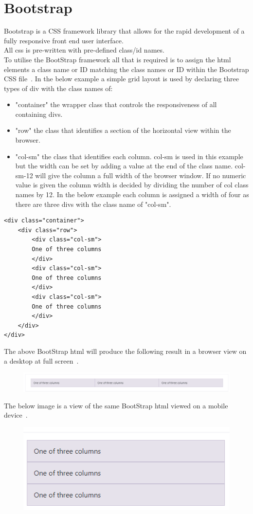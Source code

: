 \section{Bootstrap} 
Bootstrap is a CSS framework library that allows for the rapid development of a fully responsive front end user interface.\\
All css is pre-written with pre-defined class/id names.\\
To utilise the BootStrap framework all that is required is to assign the html elements a class name or ID matching the class names or ID within the Bootstrap CSS file~\cite{Bootstrap:online}.
In the below example a simple grid layout is used by declaring three types of div with the class names of:
\begin{itemize}
	\item "container" the wrapper class that controls the responsiveness of all containing divs.
	\item "row" the class that identifies a section of the horizontal view within the browser.
	\item "col-sm" the class that identifies each column. col-sm is used in this example but the width can be set by adding a value at the end of the class name. col-sm-12 will give the column a full width of the browser window. If no numeric value is given the column width is decided by dividing the number of col class names by 12. In the below example each column is assigned a width of four as there are three divs with the class name of "col-sm".
\end{itemize} 

\begin{verbatim}
<div class="container">
	<div class="row">
		<div class="col-sm">
		One of three columns
		</div>
		<div class="col-sm">
		One of three columns
		</div>
		<div class="col-sm">
		One of three columns
		</div>
	</div>
</div>
\end{verbatim}

The above BootStrap html will produce the following result in a browser view on a desktop at full screen~\cite{BootstrapGridExample:online}.
\begin{figure}[H]
	\centering
	\includegraphics[width=0.7\linewidth]{img/BootstrapFullScreen}
	\caption{}
	\label{fig:bootstrapfullscreen}
\end{figure}

The below image is a view of the same BootStrap html viewed on a mobile device~\cite{BootstrapGridExample:online}.
\begin{figure}[H]
	\centering
	\includegraphics[width=0.7\linewidth]{img/BootstrapMobile}
	\caption{}
	\label{fig:bootstrapmobile}
\end{figure}

